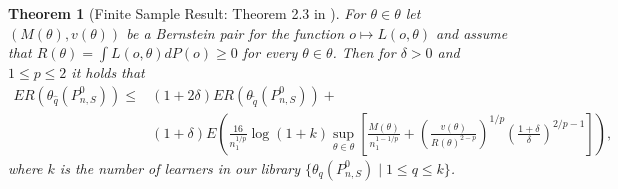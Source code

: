 \documentclass[11pt, a4paper]{article}
\newtheorem{theorem}{Theorem}
\theoremstyle{definition}
\theoremstyle{remark}
\newcommand{\q}{q}
\newcommand{\btheta}{\theta}
\begin{document}
\begin{theorem}[Finite Sample Result: Theorem 2.3 in \cite{vaart06}] \label{finitesample}
   For $ \btheta \in \btheta $ let $ (M(\btheta) , v(\btheta)) $ be a Bernstein pair for the function $ o \mapsto L(o, \btheta) $ and assume that $ R(\btheta) = \int L(o, \btheta) d P(o) \geq 0 $ for every $ \btheta \in \btheta $. Then for $ \delta > 0 $ and $ 1 \leq p \leq 2 $ it holds that 
   \begin{align*}
       ER(\btheta_{\hat{\q}}(P_{n, S}^{0})) \leq&(1 + 2 \delta) ER(\btheta_{ \tilde{\q}}(P_{n,S}^{0})) +\\
                                              &(1 + \delta) E \left(  \frac{16}{n_1^{1/p}} \log (1 +k) \sup_{\btheta \in \btheta} \left[ \frac{M(\btheta)}{n_1^{1-1/p}} +  \left( \frac{v(\btheta)}{R(\btheta)^{2-p}} \right)^{1/p} \left( \frac{1 + \delta}{\delta} \right)^{2/p-1} \right]\right),
   \end{align*}
   where $ k $ is the number of learners in our library $ \{\btheta_{\q}(P_{n, S}^{0}) \mid 1 \leq \q \leq k\} $. 
\end{theorem}
\end{document}
